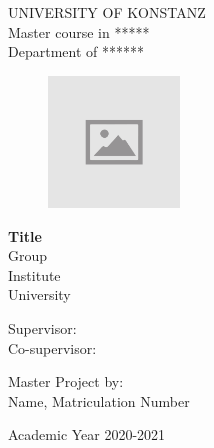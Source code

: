 \thispagestyle{empty}
\vspace*{-1.5cm} \bfseries{
\begin{center}
  \large
  UNIVERSITY OF KONSTANZ\\
  \normalsize
  Master course in *****\\
  Department of ******\\
  
 \begin{figure}[!htb]
    \centering
    \includegraphics[width=3.5cm]{./pictures/placeholder}
\end{figure}
  

  \vspace*{3.0cm} \LARGE



  \textbf{Title}\\



  \vspace*{.75truecm} \large
  Group \\
  Institute \\
  University
\end{center}
\vspace*{2.0cm} \large
\begin{flushleft}


  Supervisor: \\
  
  Co-supervisor: 

\end{flushleft}
\vspace*{1.0cm}
\begin{flushright}


  Master Project by:\\ Name, Matriculation Number \\ 


\end{flushright}
\vspace*{0.5cm}
\begin{center}



  Academic Year 2020-2021
\end{center} \clearpage
}
